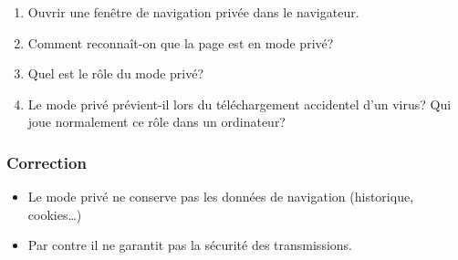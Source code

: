 \documentclass[svgnames,11pt]{beamer}
\begin{document}
\begin{frame}
    \frametitle{}

    \begin{activite}
        \begin{enumerate}
            \item Ouvrir une fenêtre de navigation privée dans le navigateur.
            \item Comment reconnaît-on que la page est en mode privé?
            \item Quel est le rôle du mode privé?
            \item Le mode privé prévient-il lors du téléchargement accidentel d'un virus? Qui joue normalement ce rôle dans un ordinateur?
        \end{enumerate}
    \end{activite}

\end{frame}
\begin{frame}
    \frametitle{Correction}

    \begin{aretenir}[]
        \begin{itemize}
            \item Le mode privé ne conserve pas les données de navigation (historique, cookies\dots)
            \item Par contre il ne garantit pas la sécurité des transmissions.
        \end{itemize}
    \end{aretenir}

\end{frame}
\end{document}
